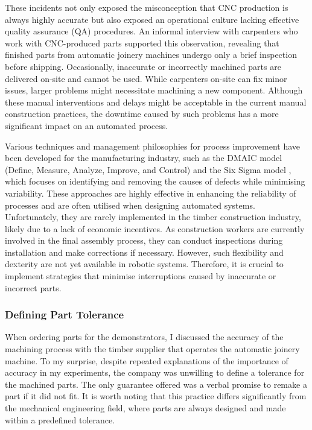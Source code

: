 These incidents not only exposed the misconception that CNC production is always highly accurate but also exposed an operational culture lacking effective quality assurance (QA) procedures. An informal interview with carpenters who work with CNC-produced parts supported this observation, revealing that finished parts from automatic joinery machines undergo only a brief inspection before shipping. Occasionally, inaccurate or incorrectly machined parts are delivered on-site and cannot be used. While carpenters on-site can fix minor issues, larger problems might necessitate machining a new component. Although these manual interventions and delays might be acceptable in the current manual construction practices, the downtime caused by such problems has a more significant impact on an automated process.

Various techniques and management philosophies for process improvement have been developed for the manufacturing industry, such as the DMAIC model (Define, Measure, Analyze, Improve, and Control) and the Six Sigma model \parencite{tsungSixSigma2023}, which focuses on identifying and removing the causes of defects while minimising variability. These approaches are highly effective in enhancing the reliability of processes and are often utilised when designing automated systems. Unfortunately, they are rarely implemented in the timber construction industry, likely due to a lack of economic incentives. As construction workers are currently involved in the final assembly process, they can conduct inspections during installation and make corrections if necessary. However, such flexibility and dexterity are not yet available in robotic systems. Therefore, it is crucial to implement strategies that minimise interruptions caused by inaccurate or incorrect parts.

\subsubsection{Defining Part Tolerance}
\label{subsubsection:new-hypo-defining-part-tolerance}

When ordering parts for the demonstrators, I discussed the accuracy of the machining process with the timber supplier that operates the automatic joinery machine. To my surprise, despite repeated explanations of the importance of accuracy in my experiments, the company was unwilling to define a tolerance for the machined parts. The only guarantee offered was a verbal promise to remake a part if it did not fit. It is worth noting that this practice differs significantly from the mechanical engineering field, where parts are always designed and made within a predefined tolerance.

